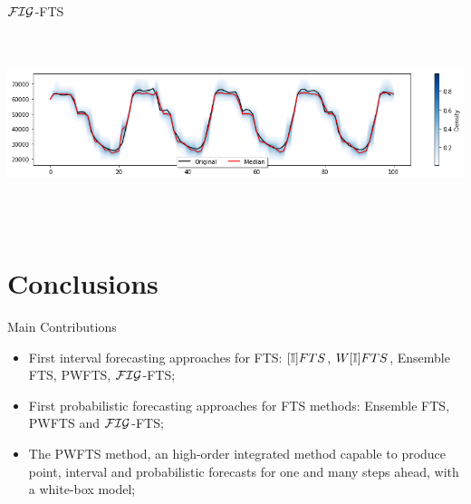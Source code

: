 \documentclass{beamer}
\begin{document}
\begin{frame}{$\mathcal{FIG}$-FTS}
\includegraphics[width=\textwidth,height=6cm]{figures/figfts_probabilistic_onestep.png}
\end{frame}

\section{Conclusions}


\begin{frame}{Main Contributions}
\begin{itemize}
    \item First interval forecasting approaches for FTS: $[\mathbb{I}]FTS$, $W[\mathbb{I}]FTS$, Ensemble FTS, PWFTS, $\mathcal{FIG}$-FTS;
    \item First probabilistic forecasting approaches for FTS methods:  Ensemble FTS, PWFTS and $\mathcal{FIG}$-FTS; 
    \item The PWFTS method, an high-order integrated method capable to produce point, interval and probabilistic forecasts for one and many steps ahead, with a white-box model;
\end{itemize}
\end{frame}

\note[itemize]{
\item 
}
\end{document}
